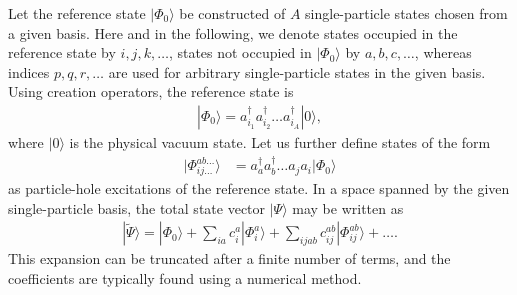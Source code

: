 \documentclass[a4paper,12pt]{report}
\begin{document}
Let the reference state $|\Phi_{0}\rangle $ be constructed of $A$ single-particle states chosen from a given basis. Here and in the following, we denote states occupied in the reference state by $i, j, k, \dots $, states not occupied in $|\Phi_{0}\rangle $ by $a, b, c, \dots $, whereas indices $p, q, r, \dots $ are used for arbitrary single-particle states in the given basis. Using creation operators, the reference state is
\begin{align}
  |\Phi_{0}\rangle = a_{i_{1}}^{\dagger }a_{i_{2}}^{\dagger }\dots a_{i_{A}}^{\dagger }|0\rangle ,
\end{align}
where $|0\rangle $ is the physical vacuum state. Let us further define states of the form
\begin{align}
  |\Phi_{ij\dots }^{ab\dots }\rangle &= a_{a}^{\dagger }a_{b}^{\dagger }\dots a_{j}a_{i}|\Phi_{0}\rangle 
\end{align}
as particle-hole excitations of the reference state. In a space spanned by the given single-particle basis, the total state vector $|\Psi \rangle $ may be written as
\begin{align}
  |\tilde{\Psi }\rangle = |\Phi_{0}\rangle + \sum_{ia}c_{i}^{a}|\Phi_{i}^{a}\rangle + \sum_{ijab} c_{ij}^{ab}|\Phi_{ij}^{ab}\rangle + \dots  . 
\end{align}
This expansion can be truncated after a finite number of terms, and the coefficients are typically found using a numerical method.




\end{document}
